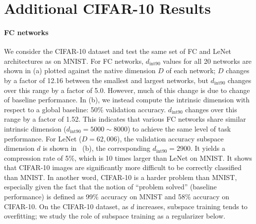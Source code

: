 \documentclass{article} %
\newcommand{\dintn}{d_{\mathrm{int90}}}
\begin{document}







\vspace{-0mm}
\section{Additional CIFAR-10 Results}

\paragraph{FC networks}
We consider the CIFAR-10 dataset and test the same set of FC and LeNet architectures as on MNIST. 
For FC networks,  $\dintn$ values for all 20 networks are shown in  (a) plotted against the native dimension $D$ of each network; $D$ changes by a factor of 12.16 between the smallest and largest networks, but $\dintn$ changes over this range by a factor of 5.0.
However, much of this change is due to change of baseline performance.
In  (b), we instead compute the intrinsic dimension with respect to a global baseline: 50\% validation accuracy. $\dintn$ changes over this range by a factor of 1.52. This indicates that various FC networks share similar intrinsic dimension ($\dintn=5000 \sim 8000$) to achieve the same level of task performance. For LeNet ($D=62,006$), the validation accuracy \vs subspace dimension $d$ is shown in~ (b), the corresponding $\dintn=2900$. It yields a compression rate of 5\%, which is 10 times larger than LeNet on MNIST. It shows that CIFAR-10 images are significantly more difficult to be correctly classified than MNIST. In another word, CIFAR-10 is a harder problem than MNIST, especially given the fact that the notion of ``problem solved'' (baseline performance) is defined as 99\% accuracy on MNIST and 58\% accuracy on CIFAR-10. On the CIFAR-10 dataset, as $d$ increases, subspace training tends to overfitting; we study the role of subspace training as a regularizer below.
\end{document}
